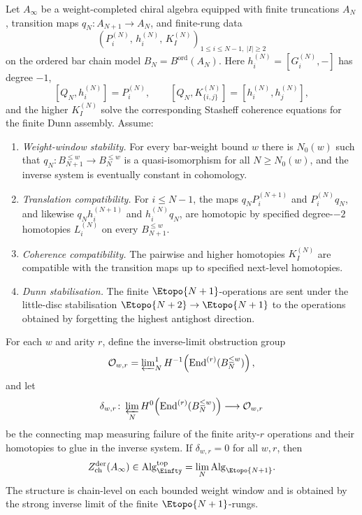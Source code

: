 \begin{theorem}
\label{thm:e-infinity-weightwise-inverse-limit}
Let \(A_\infty\) be a weight-completed chiral algebra equipped with
finite truncations \(A_N\), transition maps \(q_N\colon A_{N+1}\to A_N\),
and finite-rung data
\[
 (P_i^{(N)},\,h_i^{(N)},\,K_I^{(N)})_{1\le i\le N-1,\ |I|\ge2}
\]
on the ordered bar chain model \(B_N=B^{\mathrm{ord}}(A_N)\). Here
\(h_i^{(N)}=[G_i^{(N)},-]\) has degree \(-1\),
\[
 [Q_N,h_i^{(N)}]=P_i^{(N)},\qquad
 [Q_N,K_{\{i,j\}}^{(N)}]=[h_i^{(N)},h_j^{(N)}],
\]
and the higher \(K_I^{(N)}\) solve the corresponding Stasheff
coherence equations for the finite Dunn assembly. Assume:
\begin{enumerate}[label=\textup{(IL\arabic*)}]
\item \emph{Weight-window stability.} For every bar-weight bound \(w\)
there is \(N_0(w)\) such that \(q_N\colon B_{N+1}^{\le w}\to
B_N^{\le w}\) is a quasi-isomorphism for all \(N\ge N_0(w)\), and the
inverse system is eventually constant in cohomology.
\item \emph{Translation compatibility.} For \(i\le N-1\), the maps
\(q_NP_i^{(N+1)}\) and \(P_i^{(N)}q_N\), and likewise
\(q_Nh_i^{(N+1)}\) and \(h_i^{(N)}q_N\), are homotopic by specified
degree-\(-2\) homotopies \(L_i^{(N)}\) on every \(B_{N+1}^{\le w}\).
\item \emph{Coherence compatibility.} The pairwise and higher
homotopies \(K_I^{(N)}\) are compatible with the transition maps up to
specified next-level homotopies.
\item \emph{Dunn stabilisation.} The finite \(\Etopo{N+1}\)-operations
are sent under the little-disc stabilisation
\(\Etopo{N+2}\to\Etopo{N+1}\) to the operations obtained by forgetting
the highest antighost direction.
\end{enumerate}
For each \(w\) and arity \(r\), define the inverse-limit obstruction
group
\[
 \mathcal O_{w,r}
 =
 \varprojlim\nolimits_N^{1}
 H^{-1}\!\left(
 \operatorname{End}^{(r)}(B_N^{\le w})
 \right),
\]
and let
\[
 \delta_{w,r}\colon
 \varprojlim_N H^{0}\!\left(\operatorname{End}^{(r)}(B_N^{\le w})\right)
 \longrightarrow
 \mathcal O_{w,r}
\]
be the connecting map measuring failure of the finite arity-\(r\)
operations and their homotopies to glue in the inverse system. If
\(\delta_{w,r}=0\) for all \(w,r\), then
\[
 Z^{\mathrm{der}}_{\mathrm{ch}}(A_\infty)
 \in
 \mathrm{Alg}_{\Einfty}^{\mathrm{top}}
 =
 \lim_N \mathrm{Alg}_{\Etopo{N+1}}.
\]
The structure is chain-level on each bounded weight window and is
obtained by the strong inverse limit of the finite
\(\Etopo{N+1}\)-rungs.
\end{theorem}

